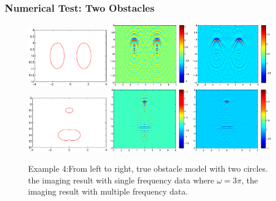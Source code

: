 \documentclass[utf-8,8pt]{beamer}
\newcommand{\om}{\omega}
\begin{document}
\begin{frame}
\frametitle{Numerical Test: Two Obstacles}
\begin{figure}[h]
	
	\includegraphics[width=0.32\textwidth,height=0.31\textheight]{./graphic/bi_circle_profile.eps}
	\includegraphics[width=0.32\textwidth]{./graphic/bi_circle_3pi.eps}
	\includegraphics[width=0.32\textwidth]{./graphic/bi_circle.eps}\\
	\includegraphics[width=0.32\textwidth,height=0.31\textheight]{./graphic/circle_0_4_peanut_1_profile.eps}
	\includegraphics[width=0.32\textwidth]{./graphic/circle_0_4_peanut_1_3pi_1.eps}
	\includegraphics[width=0.32\textwidth]{./graphic/circle_0_4_peanut_1_multi_1.eps}
	
	\caption{Example 4:From left to right,  true obstacle model with two circles. the imaging result
		with single frequency data where $\om=3\pi$, the imaging result with multiple frequency data.}
\end{figure}
\end{frame}
\end{document}
